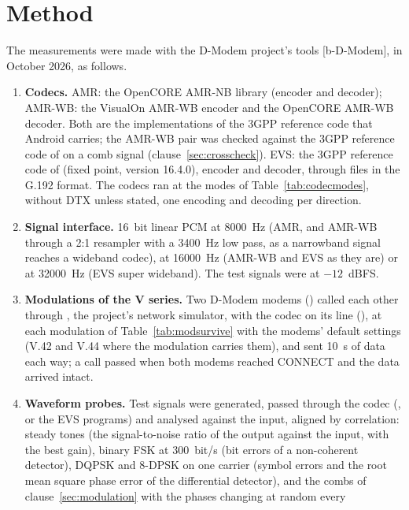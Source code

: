\section{Method}
The measurements were made with the D-Modem project's tools
[b-D-Modem], in October 2026, as follows.
\begin{enumerate}[label=\alph*)]
\item \textbf{Codecs.}  AMR: the OpenCORE AMR-NB library (encoder and
  decoder); AMR-WB: the VisualOn AMR-WB encoder and the OpenCORE AMR-WB
  decoder.  Both are the implementations of the 3GPP reference code that
  Android carries; the AMR-WB pair was checked against the 3GPP reference
  code of  on a comb signal (clause~\ref{sec:crosscheck}).
  EVS: the 3GPP reference code of  (fixed point, version
  16.4.0), encoder and decoder, through files in the G.192 format.  The
  codecs ran at the modes of Table~\ref{tab:codecmodes}, without DTX
  unless stated, one encoding and decoding per direction.
\item \textbf{Signal interface.}  16~bit linear PCM at 8000~Hz (AMR, and
  AMR-WB through a 2:1 resampler with a 3400~Hz low pass, as a narrowband
  signal reaches a wideband codec), at 16000~Hz (AMR-WB and EVS as they
  are) or at 32000~Hz (EVS super wideband).  The test signals were at
  $-12$~dBFS.
\item \textbf{Modulations of the V series.}  Two D-Modem modems
  () called each other through , the
  project's network simulator, with the codec on its line
  (), at each modulation of Table~\ref{tab:modsurvive}
  with the modems' default settings (V.42 and V.44 where the modulation
  carries them), and sent 10~s of data each way; a call passed when both
  modems reached CONNECT and the data arrived intact.
\item \textbf{Waveform probes.}  Test signals were generated, passed
  through the codec (, or the EVS programs) and
  analysed against the input, aligned by correlation: steady tones (the
  signal-to-noise ratio of the output against the input, with the best
  gain), binary FSK at 300~bit/s (bit errors of a non-coherent detector),
  DQPSK and 8-DPSK on one carrier (symbol errors and the root mean square
  phase error of the differential detector), and the combs of
  clause~\ref{sec:modulation} with the phases changing at random every

\end{enumerate}

